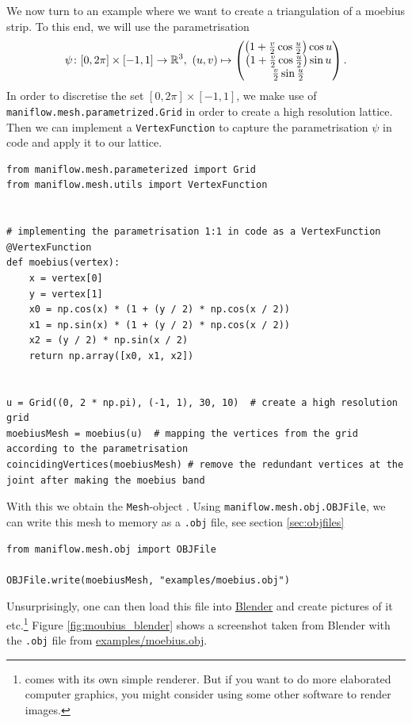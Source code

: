 \begin{ex}\label{ex:moebius_creation}
We now turn to an example where we want to create a triangulation of a moebius strip. To this end, we will use the parametrisation
\begin{align*}
    \psi\colon [0, 2\pi]\times [-1,1]\to\R^3,\ (u,v)\mapsto\begin{pmatrix}
        \left(1+\frac{v}{2}\cos{\frac{u}{2}}\right)\cos{u}\\
        \left(1+\frac{v}{2}\cos{\frac{u}{2}}\right)\sin{u}\\
        \frac{v}{2}\sin{\frac{u}{2}}
    \end{pmatrix}.
\end{align*}
In order to discretise the set $[0,2\pi]\times[-1,1]$, we make use of \texttt{maniflow.mesh.parametrized.Grid} in order to create a high resolution lattice. Then we can implement a \texttt{VertexFunction} to capture the parametrisation $\psi$ in code and apply it to our lattice.
\begin{lstlisting}
from maniflow.mesh.parameterized import Grid
from maniflow.mesh.utils import VertexFunction


# implementing the parametrisation 1:1 in code as a VertexFunction
@VertexFunction
def moebius(vertex):
    x = vertex[0]
    y = vertex[1]
    x0 = np.cos(x) * (1 + (y / 2) * np.cos(x / 2))
    x1 = np.sin(x) * (1 + (y / 2) * np.cos(x / 2))
    x2 = (y / 2) * np.sin(x / 2)
    return np.array([x0, x1, x2])


u = Grid((0, 2 * np.pi), (-1, 1), 30, 10)  # create a high resolution grid
moebiusMesh = moebius(u)  # mapping the vertices from the grid according to the parametrisation
coincidingVertices(moebiusMesh) # remove the redundant vertices at the joint after making the moebius band
\end{lstlisting}
With this we obtain the \texttt{Mesh}-object . Using \texttt{maniflow.mesh.obj.OBJFile}, we can write this mesh to memory as a \texttt{.obj} file, see section \ref{sec:objfiles}
\begin{lstlisting}
from maniflow.mesh.obj import OBJFile

OBJFile.write(moebiusMesh, "examples/moebius.obj")
\end{lstlisting}
Unsurprisingly, one can then load this file into \href{https://www.blender.org/}{Blender} and create pictures of it etc.\footnote{\maniflow{} comes with its own simple renderer. But if you want to do more elaborated computer graphics, you might consider using some other software to render images.} Figure \ref{fig:moubius_blender} shows a screenshot taken from Blender with the \texttt{.obj} file from \href{https://gitlab.gwdg.de/yangshan.xiang/scientific-computing/-/blob/82c42c864b3e46303b208b78720b8109116c78da/examples/moebius.obj}{\url{examples/moebius.obj}}.
\end{ex}
